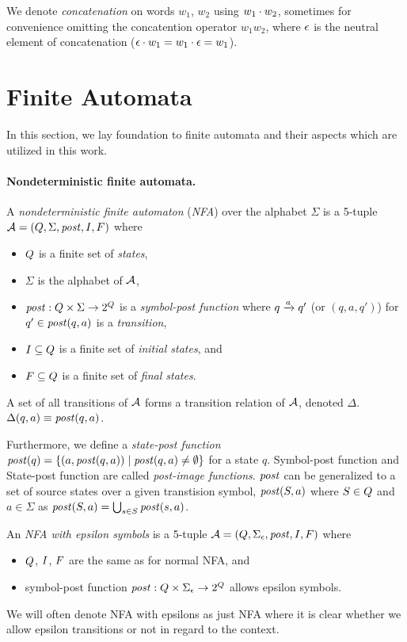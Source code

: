 We denote \emph{concatenation} on words $w_1$, $w_2$ using $w_1 \cdot w_2$, sometimes for convenience omitting the concatention operator $w_1w_2$, where $\epsilon$ is the neutral element of concatenation ($\epsilon \cdot w_1 = w_1 \cdot \epsilon = w_1$).

\section{Finite Automata}

In this section, we lay foundation to finite automata and their aspects which are utilized in this work.

\paragraph{Nondeterministic finite automata.}
A \emph{nondeterministic finite automaton} (\emph{NFA}) over the alphabet $\Sigma$ is a 5-tuple $\mathcal{A} = (Q, \Sigma, \mathit{post}, I, F)$ where
\begin{itemize}
    \item $Q$ is a finite set of \emph{states},
    \item $\Sigma$ is the alphabet of $\mathcal{A}$,
    \item $\mathit{post}: Q \times \Sigma \rightarrow 2^{Q}$ is a \emph{symbol-post function} where ${q} \xrightarrow{{a}} {q'}$ (or $(q, a, q')$) for $q' \in \mathit{post}(q, a)$ is a \emph{transition},
    \item $I \subseteq Q$ is a finite set of \emph{initial states}, and
    \item $F \subseteq Q$ is a finite set of \emph{final states}.
\end{itemize}

A set of all transitions of $\mathcal{A}$ forms a transition relation of $\mathcal{A}$, denoted $\Delta$. $\Delta(q, a) \equiv \mathit{post}(q, a)$.

Furthermore, we define a \emph{state-post function} $\mathit{post}(q) = \{ (a, \mathit{post}(q, a)) \mid \mathit{post}(q, a) \neq \emptyset \}$ for a state $q$.
Symbol-post function and State-post function are called \emph{post-image functions}.
$\mathit{post}$ can be generalized to a set of source states over a given transtision symbol, $\mathit{post}(S, a)$ where $S \in Q$ and $a \in \Sigma$ as $\mathit{post}(S, a) = \bigcup_{s \in S} \mathit{post}(s, a)$.


An \emph{NFA with epsilon symbols} is a 5-tuple $\mathcal{A} = (Q, \Sigma_\epsilon, \mathit{post}, I, F)$ where
\begin{itemize}
    \item $Q$, $I$, $F$ are the same as for normal NFA, and
    \item symbol-post function $\mathit{post}: Q \times \Sigma_\epsilon \rightarrow 2^{Q}$ allows epsilon symbols.
\end{itemize}
We will often denote NFA with epsilons as just NFA where it is clear whether we allow epsilon transitions or not in regard to the context.

